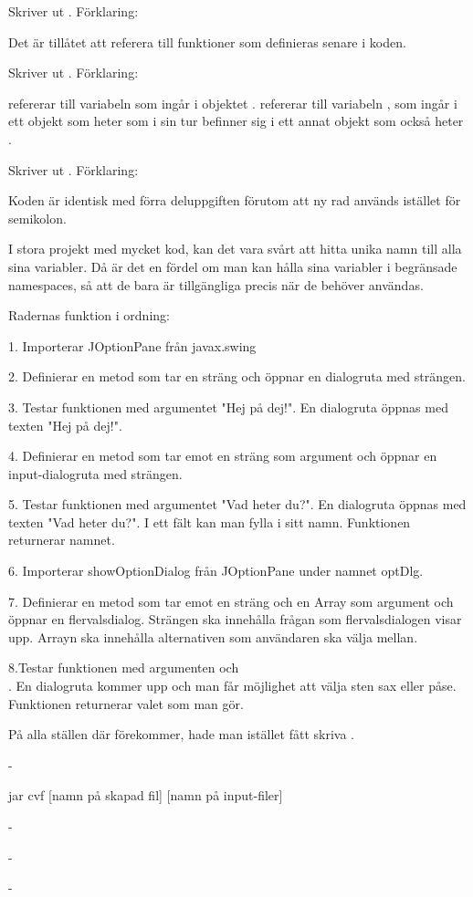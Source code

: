 \Subtask Skriver ut . Förklaring:

Det är tillåtet att referera till funktioner som definieras senare i koden.

\Subtask Skriver ut . Förklaring:

 refererar till variabeln  som ingår i objektet .
 refererar till variabeln , som ingår i ett objekt som heter  som i sin tur befinner sig i ett annat objekt som också heter .

\Subtask Skriver ut . Förklaring:

Koden är identisk med förra deluppgiften förutom att ny rad används istället för semikolon.

\Subtask I stora projekt med mycket kod, kan det vara svårt att hitta unika namn till alla sina variabler. Då är det en fördel om man kan hålla sina variabler i begränsade namespaces, så att de bara är tillgängliga precis när de behöver användas. 

\Task 

\Subtask {}

\Subtask Radernas funktion i ordning:

1. Importerar JOptionPane från javax.swing

2. Definierar en metod som tar en sträng och öppnar en dialogruta med strängen.

3. Testar funktionen med argumentet "Hej på dej!". En dialogruta öppnas med texten "Hej på dej!".

4. Definierar en metod som tar emot en sträng som argument och öppnar en input-dialogruta med strängen.

5. Testar funktionen med argumentet "Vad heter du?". En dialogruta öppnas med texten "Vad heter du?". I ett fält kan man fylla i sitt namn. Funktionen returnerar namnet.

6. Importerar showOptionDialog från JOptionPane under namnet optDlg.

7. Definierar en metod som tar emot en sträng och en Array som argument och öppnar en flervalsdialog. Strängen ska innehålla frågan som flervalsdialogen visar upp. Arrayn ska innehålla alternativen som användaren ska välja mellan.

8.Testar funktionen med argumenten  och \\ . En dialogruta kommer upp och man får möjlighet att välja sten sax eller påse. Funktionen returnerar valet som man gör.

\Subtask På alla ställen där  förekommer, hade man istället fått skriva .

\Subtask -

\Task 

\Subtask jar cvf [namn på skapad fil] [namn på input-filer]

\Subtask -

\Task 

\Subtask -

\Subtask -
